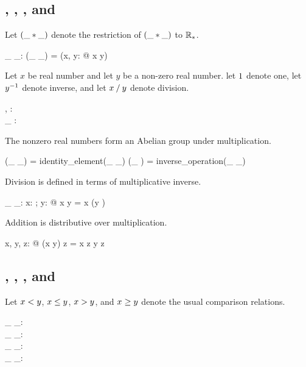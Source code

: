 \documentclass{amsart}
\begin{document}
\subsection{, , , and }

Let $(\_ \mathbin{*} \_)$ denote the restriction of $(\_ \mathbin{*} \_)$ to $\mathbb{R}_{*}$.

\begin{axdef}
	\_ \mulRnz \_: \Rnz \cross \Rnz \fun \Rnz
	\where
	(\_ \mulRnz \_) = (\lambda x, y: \Rnz @ x \mulR y)
\end{axdef}

Let $x$ be real number and let $y$ be a non-zero real number.
let $1$ denote one,
let $y ^{-1}$ denote inverse,
and let $x \mathbin{/} y$ denote division.

\begin{axdef}
	\oneR, \twoR: \Rnz \\
	\_ \invRnz: \Rnz \fun \Rnz
\end{axdef}

The nonzero real numbers form an Abelian group under multiplication.

\begin{zed}
(\_ \mulRnz \_) \in \abgroup \Rnz
\also
\oneR = identity\_element(\_ \mulRnz \_)
\also
(\_ \invRnz) = inverse\_operation(\_ \mulRnz \_)
\end{zed}

Division is defined in terms of multiplicative inverse.

\begin{axdef}
	\_ \divR \_: \R \cross \Rnz \fun \R
	\where
	\forall x: \R; y: \Rnz @ x \divR y = x \mulR (y \invRnz)
\end{axdef}

Addition is distributive over multiplication.

\begin{zed}
	\forall x, y, z: \R @ (x \addR y) \mulR z = x \mulR z \addR y \mulR z
\end{zed}

\subsection{, , , and }

Let $x \mathrel{<} y$, $x \mathrel{\leq} y$, $x \mathrel{>} y$, and $x \mathrel{\geq} y$ denote the usual comparison relations.

\begin{axdef}
	\_ \ltR \_: \R \rel \R \\
	\_ \leR \_: \R \rel \R \\
	\_ \gtR \_: \R \rel \R \\
	\_ \geR \_: \R \rel \R
\end{axdef}
\end{document}
